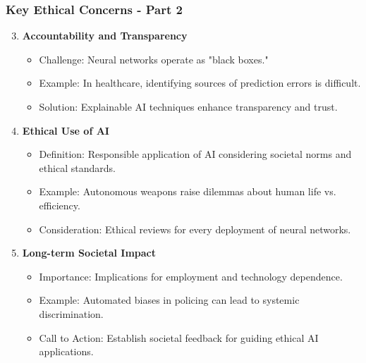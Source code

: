 \documentclass[aspectratio=169]{beamer}
\begin{document}
\begin{frame}[fragile]
    \frametitle{Key Ethical Concerns - Part 2}
    \begin{enumerate}
        \setcounter{enumi}{2} %
        \item \textbf{Accountability and Transparency}
            \begin{itemize}
                \item Challenge: Neural networks operate as "black boxes."
                \item Example: In healthcare, identifying sources of prediction errors is difficult.
                \item Solution: Explainable AI techniques enhance transparency and trust.
            \end{itemize}

        \item \textbf{Ethical Use of AI}
            \begin{itemize}
                \item Definition: Responsible application of AI considering societal norms and ethical standards.
                \item Example: Autonomous weapons raise dilemmas about human life vs. efficiency.
                \item Consideration: Ethical reviews for every deployment of neural networks.
            \end{itemize}

        \item \textbf{Long-term Societal Impact}
            \begin{itemize}
                \item Importance: Implications for employment and technology dependence.
                \item Example: Automated biases in policing can lead to systemic discrimination.
                \item Call to Action: Establish societal feedback for guiding ethical AI applications.
            \end{itemize}
    \end{enumerate}
\end{frame}
\end{document}
